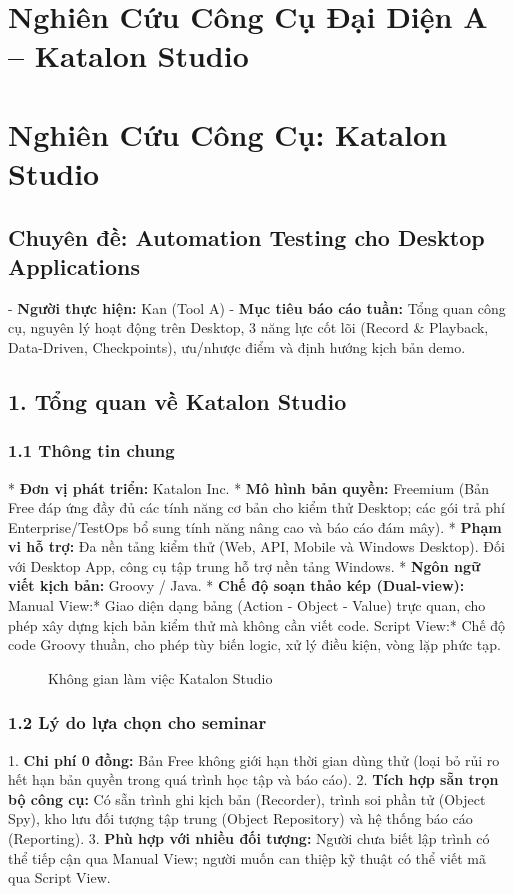 \section{Nghiên Cứu Công Cụ Đại Diện A – Katalon Studio}

\section{Nghiên Cứu Công Cụ: Katalon Studio}
\subsection{Chuyên đề: Automation Testing cho Desktop Applications}

- \textbf{Người thực hiện:} Kan (Tool A)
- \textbf{Mục tiêu báo cáo tuần:} Tổng quan công cụ, nguyên lý hoạt động trên Desktop, 3 năng lực cốt lõi (Record & Playback, Data-Driven, Checkpoints), ưu/nhược điểm và định hướng kịch bản demo.


\subsection{1. Tổng quan về Katalon Studio}

\subsubsection{1.1 Thông tin chung}
* \textbf{Đơn vị phát triển:} Katalon Inc.
* \textbf{Mô hình bản quyền:} Freemium (Bản Free đáp ứng đầy đủ các tính năng cơ bản cho kiểm thử Desktop; các gói trả phí Enterprise/TestOps bổ sung tính năng nâng cao và báo cáo đám mây).
* \textbf{Phạm vi hỗ trợ:} Đa nền tảng kiểm thử (Web, API, Mobile và Windows Desktop). Đối với Desktop App, công cụ tập trung hỗ trợ nền tảng Windows.
* \textbf{Ngôn ngữ viết kịch bản:} Groovy / Java.
* \textbf{Chế độ soạn thảo kép (Dual-view):}
  \textit{ }Manual View:* Giao diện dạng bảng (Action - Object - Value) trực quan, cho phép xây dựng kịch bản kiểm thử mà không cần viết code.
  \textit{ }Script View:* Chế độ code Groovy thuần, cho phép tùy biến logic, xử lý điều kiện, vòng lặp phức tạp.

\begin{figure}[H]
\centering
\caption{Không gian làm việc Katalon Studio}
\end{figure}


\subsubsection{1.2 Lý do lựa chọn cho seminar}
1. \textbf{Chi phí 0 đồng:} Bản Free không giới hạn thời gian dùng thử (loại bỏ rủi ro hết hạn bản quyền trong quá trình học tập và báo cáo).
2. \textbf{Tích hợp sẵn trọn bộ công cụ:} Có sẵn trình ghi kịch bản (Recorder), trình soi phần tử (Object Spy), kho lưu đối tượng tập trung (Object Repository) và hệ thống báo cáo (Reporting).
3. \textbf{Phù hợp với nhiều đối tượng:} Người chưa biết lập trình có thể tiếp cận qua Manual View; người muốn can thiệp kỹ thuật có thể viết mã qua Script View.


